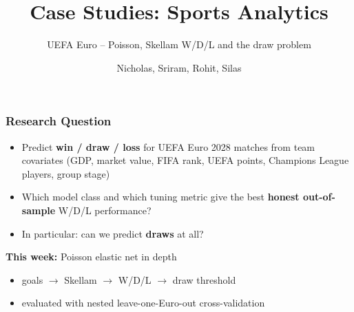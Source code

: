 \documentclass[aspectratio=1610, 9pt]{beamer}
\title{Case Studies: Sports Analytics}
\subtitle{UEFA Euro -- Poisson, Skellam W/D/L and the draw problem}
\author{Nicholas, Sriram, Rohit, Silas}
\institute{Case Studies WS 26/27}
\date{}
\begin{document}
\maketitle

\begin{frame}
  \frametitle{Research Question}

  \begin{itemize}
    \item Predict \textbf{win / draw / loss} for UEFA Euro 2028 matches from
          team covariates (GDP, market value, FIFA rank, UEFA points,
          Champions League players, group stage)
    \item Which model class and which tuning metric give the best
          \textbf{honest out-of-sample} W/D/L performance?
    \item In particular: can we predict \textbf{draws} at all?
  \end{itemize}

  \vspace{0.5em}
  \textbf{This week:} Poisson elastic net in depth
  \begin{itemize}
    \item goals $\rightarrow$ Skellam $\rightarrow$ W/D/L $\rightarrow$ draw threshold
    \item evaluated with nested leave-one-Euro-out cross-validation
  \end{itemize}

\end{frame}
\end{document}
